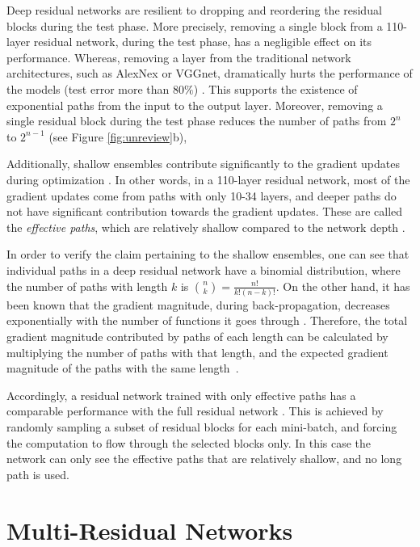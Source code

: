 \documentclass[journal]{IEEEtran}
\begin{document}
Deep residual networks are resilient to dropping and reordering the residual blocks during the test phase. More precisely, removing a single block from a 110-layer residual network, during the test phase, has a negligible effect on its performance. Whereas, removing a layer from the traditional network architectures, such as AlexNex\cite{krizhevsky2012imagenet} or VGGnet\cite{simonyan2014very}, dramatically hurts the performance of the models (test error more than $80\%$) \cite{veit2016residual}. This supports the existence of exponential paths from the input to the output layer. Moreover, removing a single residual block during the test phase reduces the number of paths from $2^n$ to $2^{n-1}$ (see Figure \ref{fig:unreview}b), 


Additionally, shallow ensembles contribute significantly to the gradient updates during optimization . In other words, in a 110-layer residual network, most of the gradient updates come from paths with only 10-34 layers, and deeper paths do not have significant contribution towards  the gradient updates. These are called the \textit{effective paths}, which are relatively shallow compared to the network depth \cite{veit2016residual}.


In order to verify the claim pertaining to the shallow ensembles, one can see that individual paths in a deep residual network have a binomial distribution, where the number of paths with length $k$ is $\binom{n}{k} = \frac{n!}{k!(n-k)!}$. On the other hand, it has been known that the gradient magnitude, during back-propagation,  decreases exponentially with the number of functions it goes through \cite{hochreiter1991untersuchungen,bengio1994learning}. Therefore, the total gradient magnitude contributed by paths of each length can be calculated by multiplying the number of paths with that length, and the expected gradient magnitude of the paths with the same length~\cite{veit2016residual}.

Accordingly, a residual network trained  with only effective paths has a comparable performance with the full residual network \cite{veit2016residual}. This is achieved by randomly sampling a subset of residual blocks for each mini-batch, and forcing the computation to flow through the selected blocks only. In this case the network can only see the effective paths that are relatively shallow, and no long path is used.

\section{Multi-Residual Networks}\label{sec4}
\end{document}
